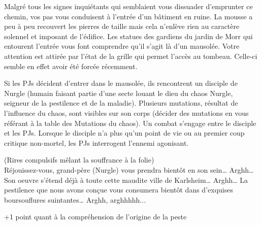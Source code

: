 \documentclass[french,oneside]{wfrp}
\begin{document}
\begin{mjbox}
  Malgré tous les signes inquiétants qui semblaient vous dissuader
  d’emprunter ce chemin, vos pas vous conduisent à l’entrée d’un
  bâtiment en ruine. La mousse a peu à peu recouvert les pierres de
  taille mais cela n’enlève rien au caractère solennel et imposant de
  l’édifice. Les statues des gardiens du jardin de Morr qui entourent
  l’entrée vous font comprendre qu’il s’agit là d’un mausolée. Votre
  attention est attirée par l’état de la grille qui permet l’accès au
  tombeau. Celle-ci semble en effet avoir été forcée récemment.
\end{mjbox}

Si les PJs décident d’entrer dans le mausolée, ils rencontrent un
disciple de Nurgle (humain faisant partie d’une secte louant le dieu
du chaos Nurgle, seigneur de la pestilence et de la
maladie). Plusieurs mutations, résultat de l’influence du chaos, sont
visibles sur son corps (décider des mutations en vous référant à la
table des Mutations du chaos). Un combat s’engage entre le disciple et
les PJs. Lorsque le disciple n’a plus qu’un point de vie ou au premier
coup critique non-mortel, les PJs interrogent l’ennemi agonisant.

\begin{mjbox}
  (Rires compulsifs mêlant la souffrance à la folie) \\
  \og Réjouissez-vous, grand-père (Nurgle) vous prendra bientôt en son
  sein… Arghh… Son oeuvre s’étend déjà à toute cette maudite ville de
  Karlsheim… Arghh…  La pestilence que nous avons conçue vous
  consumera bientôt dans d’exquises boursouflures suintantes… Arghh,
  arghhhhh...\fg{}
\end{mjbox}

\begin{gamebox}[coltext=guardsmanred]
  +1 point quant à la compréhension de l'origine de la peste
\end{gamebox}
\end{document}
